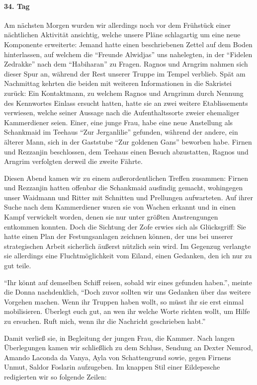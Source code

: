 \paragraph{34. Tag}
Am nächsten Morgen wurden wir allerdings noch vor dem Frühstück einer nächtlichen Aktivität ansichtig, welche unsere Pläne schlagartig um eine neue Komponente erweiterte: Jemand hatte einen beschriebenen Zettel auf dem Boden hinterlassen, auf welchem die ``Freunde Alwidjas'' uns nahelegten, in der ``Fidelen Zedrakke'' nach dem ``Habiharan'' zu Fragen. Ragnos und Arngrim nahmen sich dieser Spur an, während der Rest unserer Truppe im Tempel verblieb. Spät am Nachmittag kehrten die beiden mit weiteren Informationen in die Sakristei zurück: Ein Kontaktmann, zu welchem Ragnos und Arngrimm durch Nennung des Kennwortes Einlass ersucht hatten, hatte sie an zwei weitere Etablissements verwiesen, welche seiner Aussage nach die Aufenthaltssorte zweier ehemaliger Kammerdiener seien. Einer, eine junge Frau, habe eine neue Anstellung als Schankmaid im Teehaus ``Zur Jerganlilie'' gefunden, während der andere, ein älterer Mann, sich in der Gaststube ``Zur goldenen Gans'' beworben habe. Firnen und Rezzanjin beschlossen, dem Teehaus einen Besuch abzustatten, Ragnos und Arngrim verfolgten derweil die zweite Fährte.

Diesen Abend kamen wir zu einem außerordentlichen Treffen zusammen: Firnen und Rezzanjin hatten offenbar die Schankmaid ausfindig gemacht, wohingegen unser Waidmann und Ritter mit Schnitten und Prellungen aufwarteten. Auf ihrer Suche nach dem Kammerdiener waren sie von Wachen erkannt und in einen Kampf verwickelt worden, denen sie nur unter größten Anstrengungen entkommen konnten. Doch die Sichtung der Zofe erwies sich als Glücksgriff: Sie hatte einen Plan der Festungsanlagen zeichnen können, der uns bei unserer strategischen Arbeit sicherlich äußerst nützlich sein wird. Im Gegenzug verlangte sie allerdings eine Fluchtmöglichkeit vom Eiland, einen Gedanken, den ich nur zu gut teile.

``Ihr könnt auf demselben Schiff reisen, sobald wir eines gefunden haben.'', meinte die Donna nachdenklich, ``Doch zuvor sollten wir uns Gedanken über das weitere Vorgehen machen. Wenn ihr Truppen haben wollt, so müsst ihr sie erst einmal mobilisieren. Überlegt euch gut, an wen ihr welche Worte richten wollt, um Hilfe zu ersuchen. Ruft mich, wenn ihr die Nachricht geschrieben habt.''

Damit verließ sie, in Begleitung der jungen Frau, die Kammer. Nach langen Überlegungen kamen wir schließlich zu dem Schluss, Sendung an Dexter Nemrod, Amando Laconda da Vanya, Ayla von Schattengrund sowie, gegen Firnens Unmut, Saldor Foslarin aufzugeben. Im knappen Stil einer Eildepesche redigierten wir so folgende Zeilen:


